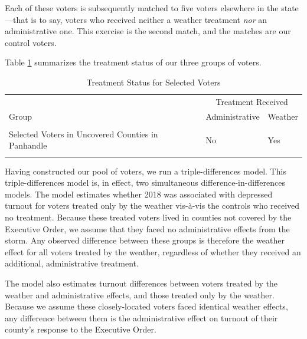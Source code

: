 \documentclass[
  12pt,
]{article}
\begin{document}
Each of these voters is subsequently matched to five voters elsewhere in the state---that is to say, voters who received neither a weather treatment \emph{nor} an administrative one. This exercise is the second match, and the matches are our control voters.

Table \ref{tab:groups} summarizes the treatment status of our three groups of voters.

\begin{singlespace}
\begin{table}[H]

\caption{\label{tab:groups-treat}\label{tab:groups} Treatment Status for Selected Voters}
\centering
\begin{tabular}[t]{>{\raggedright\arraybackslash}p{15em}ll}
\toprule
\multicolumn{1}{c}{ } & \multicolumn{2}{c}{Treatment Received} \\
\cmidrule(l{3pt}r{3pt}){2-3}
Group & Administrative & Weather\\
\midrule
\cellcolor{gray!6}{Selected Voters in Covered Counties} & \cellcolor{gray!6}{Yes} & \cellcolor{gray!6}{Yes}\\
Selected Voters in Uncovered Counties in Panhandle & No & Yes\\
\cellcolor{gray!6}{Selected Voters Elsewhere} & \cellcolor{gray!6}{No} & \cellcolor{gray!6}{No}\\
\bottomrule
\end{tabular}
\end{table}
\end{singlespace}

Having constructed our pool of voters, we run a triple-differences model. This triple-differences model is, in effect, two simultaneous difference-in-differences models. The model estimates whether 2018 was associated with depressed turnout for voters treated only by the weather vis-à-vis the controls who received no treatment. Because these treated voters lived in counties not covered by the Executive Order, we assume that they faced no administrative effects from the storm. Any observed difference between these groups is therefore the weather effect for all voters treated by the weather, regardless of whether they received an additional, administrative treatment.

The model also estimates turnout differences between voters treated by the weather and administrative effects, and those treated only by the weather. Because we assume these closely-located voters faced identical weather effects, any difference between them is the administrative effect on turnout of their county's response to the Executive Order.
\end{document}
